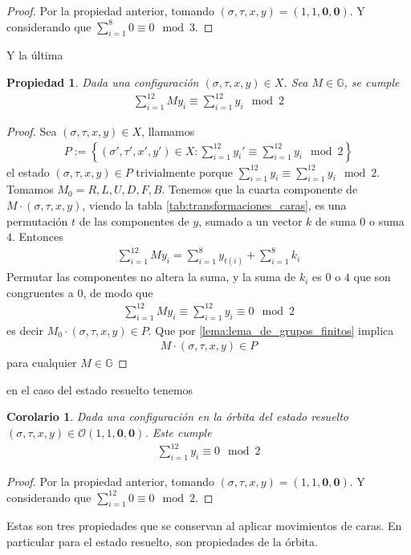 \documentclass{article}
\newtheorem{propiedad}{Propiedad}[section]
\newtheorem{corolario}{Corolario}[section]
\theoremstyle{definition}
\newcommand{\G}{\mathbb{G}}
\begin{document}
\begin{proof}
    Por la propiedad anterior, tomando $(\sigma,\tau,x,y)=(1,1,\mathbf{0},\mathbf{0})$. Y considerando que $\sum_{i=1}^8 0\equiv 0\mod{3}$.
\end{proof}
Y la última
\begin{propiedad}
    Dada una configuración $(\sigma,\tau,x,y)\in X$. Sea $M\in \G$, se cumple
    \begin{align*}
        \sum_{i=1}^{12} M y_i\equiv \sum_{i=1}^{12} y_i\mod 2
    \end{align*}
\end{propiedad}
\begin{proof}
    Sea $(\sigma,\tau,x,y)\in X$, llamamos
    \begin{align*}
        P:=\left\{(\sigma',\tau',x',y')\in X: \sum_{i=1}^{12} y_i'\equiv \sum_{i=1}^{12}y_i\mod 2\right\}
    \end{align*}
    el estado $(\sigma,\tau,x,y)\in P$ trivialmente porque $\sum_{i=1}^{12} y_i\equiv \sum_{i=1}^{12}y_i\mod 2$. Tomamos $M_0=R,L,U,D,F,B$. Tenemos que la cuarta componente de $M\cdot (\sigma,\tau,x,y)$, viendo la tabla \ref{tab:transformaciones_caras}, es una permutación $t$ de las componentes de $y$, sumado a un vector $k$ de suma $0$ o suma $4$. Entonces
    \begin{align*}
        \sum_{i=1}^{12} My_i=\sum_{i=1}^8 y_{t(i)}+\sum_{i=1}^8 k_i
    \end{align*}
    Permutar las componentes no altera la suma, y la suma de $k_i$ es $0$ o $4$ que son congruentes a $0$, de modo que
    \begin{align*}
        \sum_{i=1}^{12} My_i\equiv\sum_{i=1}^{12}y_i\equiv 0\mod 2
    \end{align*}
    es decir $M_0\cdot (\sigma,\tau,x,y)\in P$. Que por \ref{lema:lema_de_grupos_finitos} implica
    \begin{align*}
        M\cdot (\sigma,\tau,x,y)\in P
    \end{align*}
    para cualquier $M\in \G$
\end{proof}
en el caso del estado resuelto tenemos
\begin{corolario}
    Dada una configuración en la órbita del estado resuelto $(\sigma,\tau,x,y)\in \mathcal{O}(1,1,\mathbf{0},\mathbf{0})$. Este cumple
    \begin{align*}
        \sum_{i=1}^{12} y_i\equiv 0\mod 2
    \end{align*}
\end{corolario}
\begin{proof}
    Por la propiedad anterior, tomando $(\sigma,\tau,x,y)=(1,1,\mathbf{0},\mathbf{0})$. Y considerando que $\sum_{i=1}^{12} 0\equiv 0\mod{2}$.
\end{proof}
Estas son tres propiedades que se conservan al aplicar movimientos de caras. En particular para el estado resuelto, son propiedades de la órbita.
\end{document}
